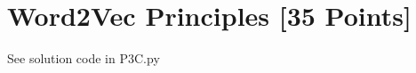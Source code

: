 \begin{solution}




 
\end{solution}






\newpage
\section{Word2Vec Principles [35 Points]}

\problem[5]


\begin{solution}

\end{solution}


\newpage
\problem[10]

\begin{solution}

\end{solution}


\newpage
\problem[3]


\begin{solution}

\end{solution}




\newpage
\problem[10]



\begin{solution}
See solution code in P3C.py
\end{solution}


\newpage
\problem[2]


\begin{solution}

\end{solution}

\newpage
\problem[2]

\begin{solution}

\end{solution}

\newpage
\problem[1]

\begin{solution}

%

\end{solution}
\newpage

\problem[2]

\begin{solution}


\end{solution}



